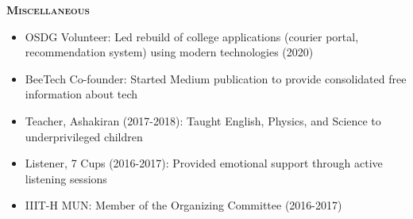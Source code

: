 \documentclass[10pt]{article}
\newcommand{\headerwidth}{7.45in}
\newenvironment{changemargin}[2]{%
  \begin{list}{}{%
    \setlength{\topsep}{0pt}%
    \setlength{\leftmargin}{#1}%
    \setlength{\rightmargin}{#2}%
    \setlength{\listparindent}{\parindent}%
    \setlength{\itemindent}{\parindent}%
    \setlength{\parsep}{\parskip}%
  }%
  \item[]}{\end{list}
}
\newcommand{\header}[1]{
	\begin{changemargin}{-0.75in}{-0.75in}
    \begin{tcolorbox}[colframe=mycolor,boxrule=0.0pt,arc=0pt,
      left=6pt,right=6pt,top=6pt,bottom=6pt,boxsep=0pt,width=\headerwidth]
		\scshape{\textbf{#1}}
\end{tcolorbox}
	\end{changemargin}
}
\newenvironment{body} {
	\vspace*{-16pt}
	\begin{changemargin}{-0.6in}{-0.65in}
  }
	{\end{changemargin}
}
\begin{document}
\smallskip
\header{Miscellaneous}
\begin{body}
    \vspace{10pt}
    \begin{itemize}
        \item OSDG Volunteer: Led rebuild of college applications (courier portal, recommendation system) using modern technologies (2020)
        \item BeeTech Co-founder: Started Medium publication to provide consolidated free information about tech
        \item Teacher, Ashakiran (2017-2018): Taught English, Physics, and Science to underprivileged children
        \item Listener, 7 Cups (2016-2017): Provided emotional support through active listening sessions
        \item IIIT-H MUN: Member of the Organizing Committee (2016-2017)
    \end{itemize}
\end{body}
\end{document}
